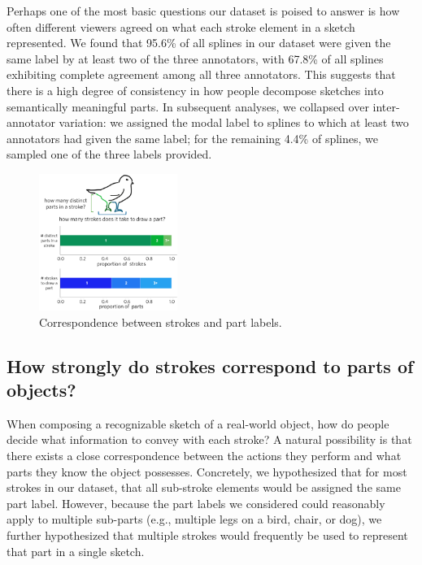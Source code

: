 \documentclass[10pt,letterpaper]{article}
\begin{document}
Perhaps one of the most basic questions our dataset is poised to answer is how often different viewers agreed on what each stroke element in a sketch represented. 
We found that 95.6\% of all splines in our dataset were given the same label by at least two of the three annotators, with 67.8\% of all splines exhibiting complete agreement among all three annotators. 
This suggests that there is a high degree of consistency in how people decompose sketches into semantically meaningful parts. 
In subsequent analyses, we collapsed over inter-annotator variation: we assigned the modal label to splines to which at least two annotators had given the same label; for the remaining 4.4\% of splines, we sampled one of the three labels provided.

\begin{figure}[htbp]
\centering
\includegraphics[width=0.4\textwidth]{figures/stroke_part_relationship.pdf}
\caption{Correspondence between strokes and part labels.}
\label{stroke_to_part}
\end{figure}

\subsection{How strongly do strokes correspond to parts of objects?}

When composing a recognizable sketch of a real-world object, how do people decide what information to convey with each stroke? 
A natural possibility is that there exists a close correspondence between the actions they perform and what parts they know the object possesses. 
Concretely, we hypothesized that for most strokes in our dataset, that all sub-stroke elements would be assigned the same part label. 
However, because the part labels we considered could reasonably apply to multiple sub-parts (e.g., multiple legs on a bird, chair, or dog), we further hypothesized that multiple strokes would frequently be used to represent that part in a single sketch.
\end{document}
